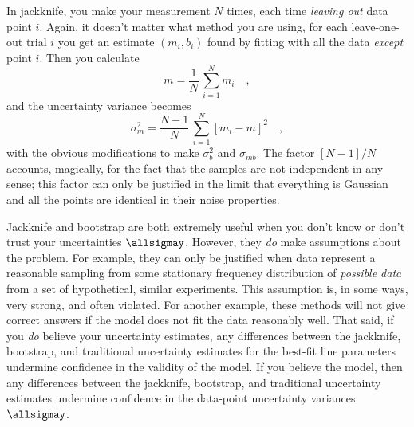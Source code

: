 \documentclass[12pt,twoside,pdftex]{article}
\begin{document}
In jackknife, you make your measurement $N$ times, each time
\emph{leaving out} data point $i$.  Again, it doesn't matter what
method you are using, for each leave-one-out trial $i$ you get an
estimate $(m_i,b_i)$ found by fitting with all the data \emph{except}
point $i$.  Then you calculate
\begin{equation}
m = \frac{1}{N}\,\sum_{i=1}^N m_i \quad ,
\end{equation}
and the uncertainty variance becomes
\begin{equation}
\sigma_m^2 = \frac{N-1}{N}\,\sum_{i=1}^N [m_i-m]^2 \quad ,
\end{equation}
with the obvious modifications to make $\sigma_b^2$ and $\sigma_{mb}$.
The factor $[N-1]/N$ accounts, magically, for the fact that the
samples are not independent in any sense; this factor can only be
justified in the limit that everything is Gaussian and all the points
are identical in their noise properties.

Jackknife and bootstrap are both extremely useful when you don't know
or don't trust your uncertainties $\allsigmay$.  However, they
\emph{do} make assumptions about the problem.  For example, they can
only be justified when data represent a reasonable sampling from some
stationary frequency distribution of \emph{possible data} from a set
of hypothetical, similar experiments.  This assumption is, in some
ways, very strong, and often violated.  For another example, these methods will not give
correct answers if the model does not fit the data reasonably well.
That said, if you \emph{do} believe your uncertainty estimates, any
differences between the jackknife, bootstrap, and traditional
uncertainty estimates for the best-fit line parameters undermine
confidence in the validity of the model.  If you believe the model,
then any differences between the jackknife, bootstrap, and traditional
uncertainty estimates undermine confidence in the data-point
uncertainty variances $\allsigmay$.
\end{document}
